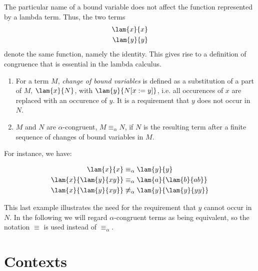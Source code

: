 The particular name of a bound variable does not affect the function represented 
by a lambda term. Thus, the two terms
\begin{align*}
	\lam{x}{x} \\
	\lam{y}{y}
\end{align*}
denote the same function, namely the identity. This gives rise to a definition of congruence
that is essential in the lambda calculus.
\begin{definition}
	\begin{enumerate}
		\item For a term $M$, \emph{change of bound variables} is defined as a substitution
		of a part of $M$, $\lam{x}{N}$, with $\lam{y}{N[x:=y]}$, i.e. all occurences of $x$
		are replaced with an occurence of $y$. It is a requirement that $y$ does not 
		occur in $N$.
		\item $M$ and $N$ are $\alpha$-congruent, $M\equiv_\alpha N$, if $N$ is the
		resulting term after a finite sequence of changes of bound variables in $M$.
	\end{enumerate}
\end{definition} 
For instance, we have:
\begin{example}
\begin{align*}
	\lam{x}{x}&\equiv_\alpha\lam{y}{y} \\
	\lam{x}{\lam{y}{xy}}&\equiv_\alpha{\lam{a}{\lam{b}{ab}}} \\
	\lam{x}{\lam{y}{xy}}&\not\equiv_\alpha\lam{y}{\lam{y}{yy}}
\end{align*}
\end{example}
This last example illustrates the need for the requirement that $y$ cannot
occur in $N$. In the following we will regard $\alpha$-congruent terms as
being equivalent, so the notation $\equiv$ is used instead of
$\equiv_\alpha$.

\section{Contexts}


